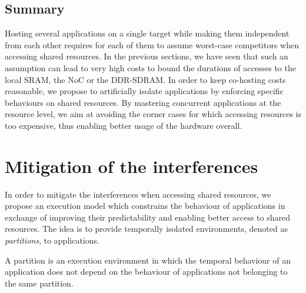 \documentclass[main.tex]{subfiles}
\begin{document}



\subsection{Summary}

Hosting several applications on a single target while making them independent from each other requires for each of them to assume worst-case competitors when accessing shared resources. In the previous sections, we have seen that such an assumption can lead to very high costs to bound the durations of accesses to the local SRAM, the NoC or the DDR-SDRAM. In order to keep co-hosting costs reasonable, we propose to artificially isolate applications by enforcing specific behaviours on shared resources. By mastering concurrent applications at the resource level, we aim at avoiding the corner cases for which accessing resources is too expensive, thus enabling better usage of the hardware overall.


\section{Mitigation of the interferences}

In order to mitigate the interferences when accessing shared resources, we propose an execution model which constrains the behaviour of applications in exchange of improving their predictability and enabling better access to shared resources. The idea is to provide temporally isolated environments, denoted as \emph{partitions}, to applications. 

\begin{definition}[Partition]
A partition is an execution environment in which the temporal behaviour of an application does not depend on the behaviour of applications not belonging to the same partition. 
\end{definition}
\end{document}
